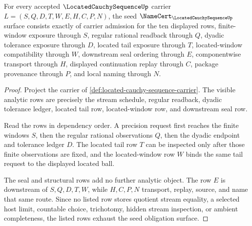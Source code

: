 \begin{theorem}\label{thm:located-cauchy-sequence-namecert-obligations}
For every accepted $\LocatedCauchySequenceUp$ carrier $L=(S,Q,D,T,W,E,H,C,P,N)$, the seed $\NameCert_{\LocatedCauchySequenceUp}$ surface consists exactly of carrier admission for the ten displayed rows, finite-window exposure through $S$, regular rational readback through $Q$, dyadic tolerance exposure through $D$, located tail exposure through $T$, located-window compatibility through $W$, downstream seal ordering through $E$, componentwise transport through $H$, displayed continuation replay through $C$, package provenance through $P$, and local naming through $N$.
\end{theorem}
\begin{proof}
Project the carrier of \autoref{def:located-cauchy-sequence-carrier}. The visible analytic rows are precisely the stream schedule, regular readback, dyadic tolerance ledger, located tail row, located-window row, and downstream seal row.

Read the rows in dependency order. A precision request first reaches the finite windows $S$, then the regular rational observations $Q$, then the dyadic endpoint and tolerance ledger $D$. The located tail row $T$ can be inspected only after those finite observations are fixed, and the located-window row $W$ binds the same tail request to the displayed located ball.

The seal and structural rows add no further analytic object. The row $E$ is downstream of $S,Q,D,T,W$, while $H,C,P,N$ transport, replay, source, and name that same route. Since no listed row stores quotient stream equality, a selected host limit, countable choice, trichotomy, hidden stream inspection, or ambient completeness, the listed rows exhaust the seed obligation surface.
\end{proof}

